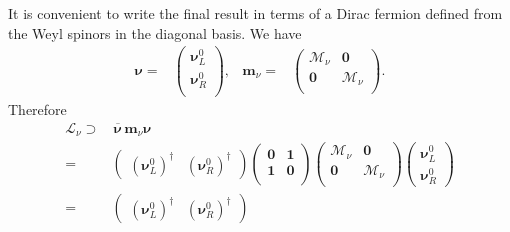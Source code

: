 \begin{frame}
It is convenient to write the final result in terms of a Dirac fermion defined from the Weyl spinors in the diagonal basis. We have
\begin{align}
  \boldsymbol{\nu}=&
  \begin{pmatrix}
    \boldsymbol{\nu}_L^0\\
    \boldsymbol{\nu}_R^0\\
  \end{pmatrix},&       \boldsymbol{m}_{\nu}=& \begin{pmatrix}
                                      \boldsymbol{\mathcal{M}}_{\nu} & \boldsymbol{0} \\
                                      \boldsymbol{0} & \boldsymbol{\mathcal{M}}_{\nu}  \\
                                    \end{pmatrix}.
\end{align}
Therefore
\begin{align}
    \mathcal{L}_{\nu}\supset &\, \overline{\boldsymbol{\nu}}\, \boldsymbol{m}_{\nu} \boldsymbol{\nu}   \nonumber\\
=&  \begin{pmatrix}
    \left( \boldsymbol{\nu}_L^0 \right)^{\dagger}&
    \left(\boldsymbol{\nu}_R^0  \right)^{\dagger}
  \end{pmatrix}
                                    \begin{pmatrix}
                                      \boldsymbol{0} & \boldsymbol{1} \\
                                      \boldsymbol{1} & \boldsymbol{0} \\
                                    \end{pmatrix}
  \begin{pmatrix}
                                      \boldsymbol{\mathcal{M}}_{\nu} & \boldsymbol{0} \\
                                      \boldsymbol{0} & \boldsymbol{\mathcal{M}}_{\nu}  \\
                                    \end{pmatrix}
\begin{pmatrix}
    \boldsymbol{\nu}_L^{0} \\
    \boldsymbol{\nu}_R^{0}
  \end{pmatrix} \nonumber\\
=&  \begin{pmatrix}
    \left( \boldsymbol{\nu}_L^0 \right)^{\dagger}&
    \left(\boldsymbol{\nu}_R^0  \right)^{\dagger}

\end{pmatrix}
\end{align}
\end{frame}
